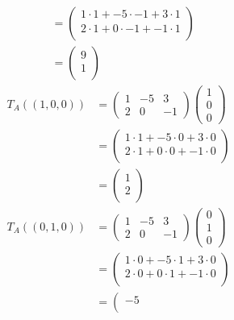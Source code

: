 \documentclass{ximera}
\begin{document}
\begin{example}
\begin{align*}
& = \left(\begin{array}{c} 
1\cdot 1 + -5\cdot -1 + 3\cdot 1\\
2\cdot 1 + 0\cdot -1 + -1\cdot 1\\
\end{array}\right)\\
& = \left(\begin{array}{c} 
9\\
1\\
\end{array}\right)
\end{align*}
\begin{align*}
T_A((1,0,0)) &= \left(\begin{array}{ccc}
1 & -5 & 3\\
2 & 0 & -1
\end{array}\right)\left(\begin{array}{c} 1\\0\\0\end{array}\right)\\
& = \left(\begin{array}{c} 
1\cdot 1 + -5\cdot 0 + 3\cdot 0\\
2\cdot 1 + 0\cdot 0 + -1\cdot 0\\
\end{array}\right)\\
& = \left(\begin{array}{c} 
1\\
2\\
\end{array}\right)
\end{align*}
\begin{align*}
T_A((0,1,0)) &= \left(\begin{array}{ccc}
1 & -5 & 3\\
2 & 0 & -1
\end{array}\right)\left(\begin{array}{c} 0\\1\\0\end{array}\right)\\
& = \left(\begin{array}{c} 
1\cdot 0 + -5\cdot 1 + 3\cdot 0\\
2\cdot 0 + 0\cdot 1 + -1\cdot 0\\
\end{array}\right)\\
& = \left(\begin{array}{c} 
-5\\

\end{array}
\end{align*}
\end{example}
\end{document}
